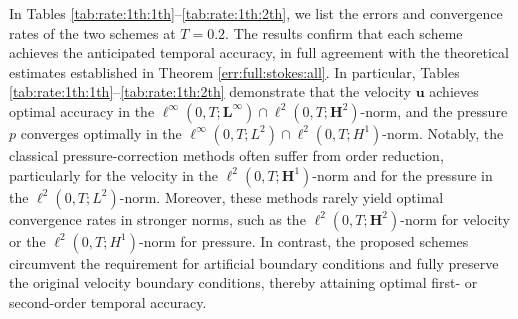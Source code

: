 In Tables \ref{tab:rate:1th:1th}--\ref{tab:rate:1th:2th}, we list the errors and convergence rates of the two schemes at $T=0.2$. The results confirm that each scheme achieves the anticipated temporal accuracy, in full agreement with the theoretical estimates established in Theorem \ref{err:full:stokes:all}. In particular, Tables \ref{tab:rate:1th:1th}--\ref{tab:rate:1th:2th} demonstrate that the velocity $\bm u$ achieves optimal accuracy in the $\ell^\infty(0, T;\bm L^{\infty}) \cap \ell^2(0, T;\bm H^{2})$-norm, and the pressure $p$ converges optimally in the $\ell^\infty(0, T;L^{2}) \cap \ell^2(0, T;H^{1})$-norm. Notably, the classical pressure-correction methods \cite{guermond2006overview,li2022fully} often suffer from order reduction, particularly for the velocity in the $\ell^{2}(0, T; \bm H^1)$-norm and for the pressure in the $\ell^{2}(0, T; L^2)$-norm. Moreover, these methods rarely yield optimal convergence rates in stronger norms, such as the $\ell^2(0, T;\bm H^{2})$-norm for velocity or the $\ell^{2}(0, T; H^1)$-norm for pressure. In contrast, the proposed schemes circumvent the requirement for artificial boundary conditions and fully preserve the original velocity boundary conditions, thereby attaining optimal first- or second-order temporal accuracy.
